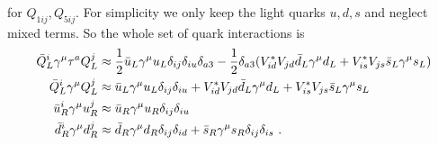 for $Q_{1ij}, Q_{5ij}$. For simplicity we only keep the light quarks $u,d,s$ and neglect mixed terms. So the whole set of quark interactions is
\begin{align}
	\bar{Q}_L^i\gamma^\mu\tau^a Q_L^j &\approx \frac{1}{2}\bar{u}_L\gamma^\mu u_L\delta_{ij}\delta_{iu}\delta_{a3} - \frac{1}{2}\delta_{a3}(V_{id}^*V_{jd}\bar{d}_L\gamma^\mu d_L + V_{is}^*V_{js}\bar{s}_L\gamma^\mu s_L)\notag \\
	\bar{Q}_L^i\gamma^\mu Q_L^j &\approx \bar{u}_L\gamma^\mu u_L\delta_{ij}\delta_{iu} + V_{id}^*V_{jd}\bar{d}_L\gamma^\mu d_L + V_{is}^*V_{js}\bar{s}_L\gamma^\mu s_L\notag \\
	\bar{u}_R^i\gamma^\mu u_R^j &\approx\bar{u}_R\gamma^\mu u_R\delta_{ij}\delta_{iu}\notag \\
	\bar{d}_R^i\gamma^\mu d_R^j &\approx \bar{d}_R\gamma^\mu d_R\delta_{ij}\delta_{id} + \bar{s}_R\gamma^\mu s_R\delta_{ij}\delta_{is} \ .
\end{align}


